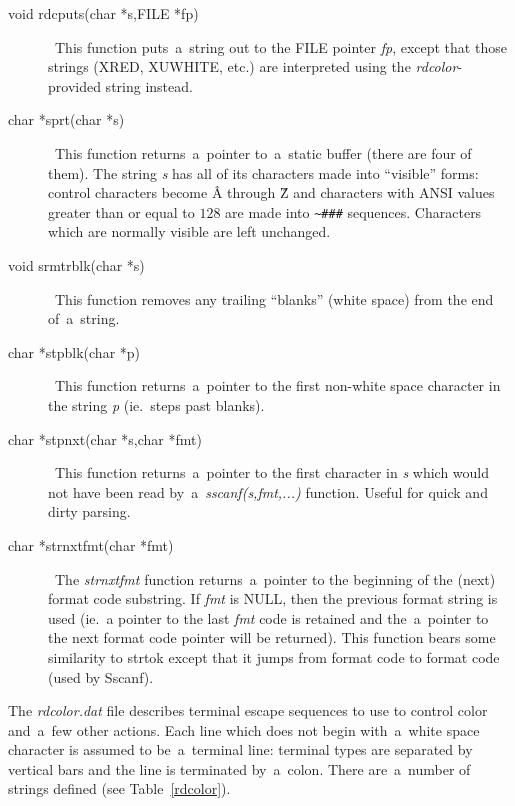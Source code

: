 \documentclass[12pt]{article}
\begin{document}
\begin{description}
  \item[void rdcputs(char *s,FILE *fp)] \     This function puts~a~string out to the {\small FILE} pointer {\em fp},
    except that those strings ({\small XRED}, {\small XUWHITE}, etc.) are
    interpreted using the {\em rdcolor}-provided string instead.

  \item[char *sprt(char *s)] \     This function returns~a~pointer to~a~static buffer (there are four of them).
    The string {\em s} has all of its characters made into ``visible'' forms:
    control characters become \^A through \^Z and characters with {\small ANSI}
    values greater than or equal to $128$ are made into \verb`~###` sequences.
    Characters which are normally visible are left unchanged.

  \item[void srmtrblk(char *s)] \     This function removes any trailing ``blanks'' (white space) from the
    end of~a~string.

  \item[char *stpblk(char *p)] \     This function returns~a~pointer to the first non-white space character
    in the string {\em p} (ie.~steps past blanks).

  \item[char *stpnxt(char *s,char *fmt)] \     This function returns~a~pointer to the first character in {\em s} which
    would not have been read by~a~{\em sscanf(s,fmt,...)} function.  Useful
    for quick and dirty parsing.

  \item[char *strnxtfmt(char *fmt)] \     The {\em strnxtfmt} function returns~a~pointer to the beginning of the
    (next) format code substring.  If {\em fmt} is {\small NULL}, then the
    previous format string is used (ie.~a pointer to the last {\em fmt} code
    is retained and the~a~pointer to the next format code pointer will be
    returned).  This function bears some similarity to {\small strtok} except
    that it jumps from format code to format code (used by Sscanf).

\end{description}

The {\em rdcolor.dat\/} file describes terminal escape sequences to use
to control color and~a~few other actions.  Each line which does not begin
with~a~white space character is assumed to be~a~terminal line: terminal
types are separated by vertical bars and the line is terminated by~a~colon.
There are~a~number of strings defined (see Table~\ref{rdcolor}).
\end{document}
